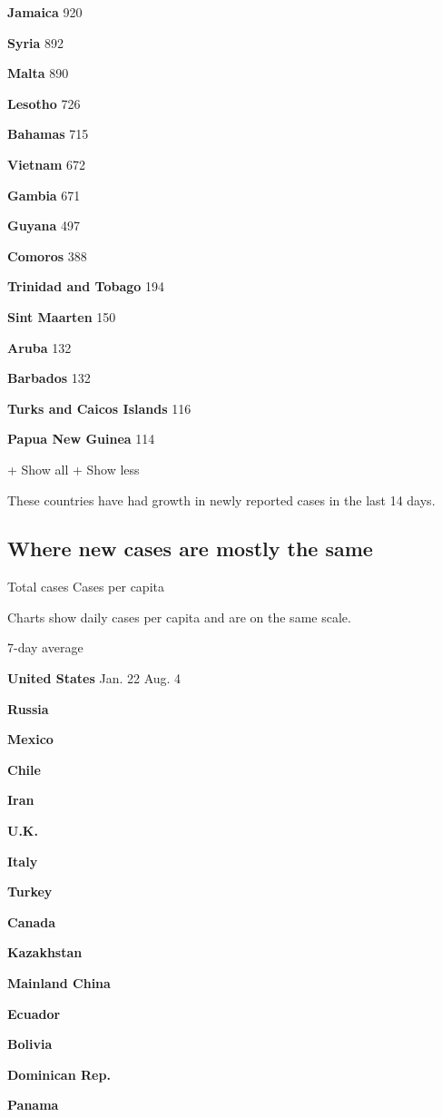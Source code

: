 \textbf{Jamaica} 920

\textbf{Syria} 892

\textbf{Malta} 890

\textbf{Lesotho} 726

\textbf{Bahamas} 715

\textbf{Vietnam} 672

\textbf{Gambia} 671

\textbf{Guyana} 497

\textbf{Comoros} 388

\textbf{Trinidad and Tobago} 194

\textbf{Sint Maarten} 150

\textbf{Aruba} 132

\textbf{Barbados} 132

\textbf{Turks and Caicos Islands} 116

\textbf{Papua New Guinea} 114

+ Show all + Show less

These countries have had growth in newly reported cases in the last 14
days.

\hypertarget{where-new-cases-are-mostly-the-same}{%
\subsection{Where new cases are mostly the
same}\label{where-new-cases-are-mostly-the-same}}

Total cases Cases per capita

Charts show daily cases per capita and are on the same scale.

7-day average

\textbf{United States} Jan. 22 Aug. 4

\textbf{Russia}

\textbf{Mexico}

\textbf{Chile}

\textbf{Iran}

\textbf{U.K.}

\textbf{Italy}

\textbf{Turkey}

\textbf{Canada}

\textbf{Kazakhstan}

\textbf{Mainland China}

\textbf{Ecuador}

\textbf{Bolivia}

\textbf{Dominican Rep.}

\textbf{Panama}

